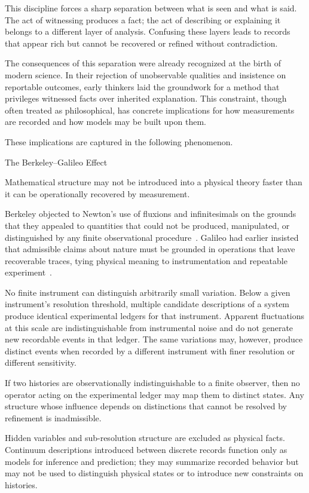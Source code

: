 This discipline forces a sharp separation between what is seen and what
is said.  The act of witnessing produces a fact; the act of describing
or explaining it belongs to a different layer of analysis.  Confusing
these layers leads to records that appear rich but cannot be recovered
or refined without contradiction.

The consequences of this separation were already recognized at the
birth of modern science.  In their rejection of unobservable qualities
and insistence on reportable outcomes, early thinkers laid the
groundwork for a method that privileges witnessed facts over inherited
explanation.  This constraint, though often treated as philosophical,
has concrete implications for how measurements are recorded and how
models may be built upon them.

These implications are captured in the following phenomenon.

\begin{phenom}{The  Berkeley--Galileo Effect~\cite{berkeley1734,galileo1638}}
\label{ph:fact-effect}

\PhStatement
Mathematical structure may not be introduced into a physical theory faster than
it can be operationally recovered by measurement.

\PhOrigin
Berkeley objected to Newton's use of fluxions and infinitesimals on the grounds
that they appealed to quantities that could not be produced, manipulated, or
distinguished by any finite observational procedure~\cite{berkeley1734}. Galileo had earlier
insisted that admissible claims about nature must be grounded in operations that
leave recoverable traces, tying physical meaning to instrumentation and repeatable
experiment~\cite{galileo1638}.

\PhObservation
No finite instrument can distinguish arbitrarily small variation. Below a given
instrument's resolution threshold, multiple candidate descriptions of a system
produce identical experimental ledgers for that instrument. Apparent
fluctuations at this scale are indistinguishable from instrumental noise and do
not generate new recordable events in that ledger. The same variations may,
however, produce distinct events when recorded by a different instrument with
finer resolution or different sensitivity.

\PhConstraint
If two histories are observationally indistinguishable to a finite
observer, then no operator acting on the experimental ledger may map them to
distinct states. Any structure whose influence depends on distinctions that
cannot be resolved by refinement is inadmissible.

\PhConsequence
Hidden variables and sub-resolution structure are excluded as physical facts.
Continuum descriptions introduced between discrete records function only as
models for inference and prediction; they may summarize recorded behavior but
may not be used to distinguish physical states or to introduce new constraints
on histories.

\end{phenom}

